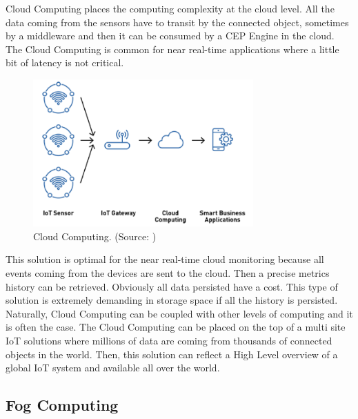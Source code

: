 \documentclass[11pt]{article}
\begin{document}
Cloud Computing places the computing complexity at the cloud level. All the data coming from the sensors have to transit by the connected object, sometimes by a middleware and then it can be consumed by a CEP Engine in the cloud. The Cloud Computing is common for near real-time applications where a little bit of latency is not critical.
\newline
\begin{figure}[h]
	\includegraphics[width=\textwidth,height=160pt]{assets/Cloud_Computing.png}
	\caption[Cloud Computing]{
	Cloud Computing. (Source: \cite{cloud-computing})}
	\label{fig:Cloud-Computing}
\end{figure}

This solution is optimal for the near real-time cloud monitoring because all events coming from the devices are sent to the cloud. Then a precise metrics history can be retrieved. Obviously all data persisted have a cost. This type of solution is extremely demanding in storage space if all the history is persisted.
\newline
\newline
Naturally, Cloud Computing can be coupled with other levels of computing and it is often the case. The Cloud Computing can be placed on the top of a multi site IoT solutions where millions of data are coming from thousands of connected objects in the world. Then, this solution can reflect a High Level overview of a global IoT system and available all over the world.


\subsection{Fog Computing}
\end{document}
